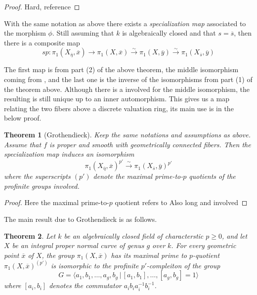 \documentclass{article}
\newtheorem{theorem}{Theorem}[section]
\theoremstyle{definition}
\theoremstyle{remark}
\begin{document}
 \begin{proof}
	 Hard,  reference
 \end{proof}

 With the same notation as above there exists a \textit{specialization map} associated to the morphism $\phi$.
 Still assuming that $k$ is algebraically closed and that $s = \overline{s}$, then there is a composite map
 \[\textit{sp}: \pi_1(X_{\overline{\eta}}, \overline{x}) \to \pi_1(X, \overline{x}) \xrightarrow{\sim} \pi_1(X, \overline{y}) \xrightarrow{\sim} \pi_1(X_{\overline{s}}, \overline{y})\]

 The first map is from part (2) of the above theorem, the middle isomorphism coming from , and the last one is the inverse of the isomorphisms from part (1) of the theorem above.
Although there is a involved for the middle isomorphism, the resulting is still unique up to an inner automorphism.
This gives us a map relating the two fibers above a discrete valuation ring, its main use is in the below proof.

\begin{theorem}[Grothendieck] 
	Keep the same notations and assumptions as above.
	Assume that $f$ is proper and smooth with geometrically connected fibers.
	Then the specialization map induces an isomorphism 
	\[\pi_1(X_{\overline{\eta}}, \overline{x})^{p'} \xrightarrow{\sim} \pi_1(X_{\overline{s}}, \overline{y})^{p'}\]
	where the superscripts $(p')$ denote the maximal prime-to-$p$ quotients of the profinite groups involved.
	
\end{theorem}

 \begin{proof}
	 Here the maximal prime-to-$p$ quotient refers to 
	 Also long and involved 
 \end{proof}
 
 The main result due to Grothendieck is as follows.
\begin{theorem}
	Let $k$ be an algebraically closed field of characterstic $p \geq 0$, and let $X$ be an integral proper normal curve of genus $g$ over $k$.
	For every geometric point $\overline{x}$ of $X$, the group $\pi_1(X, \overline{x})$ has its maximal prime to $p$-quotient $\pi_1(X, \overline{x})^{(p')}$ is isomorphic to the profinite $p'$-compleiton of the group
	\[G = \langle a_1, b_1, \dots, a_g, b_g \,|\, [a_1,b_1], \dots, [a_g, b_g] = 1\rangle\]
	where $[a_i, b_i]$ denotes the commutator $a_i b_i a_i^{-1} b_i^{-1}$.
\end{theorem}
\end{document}
